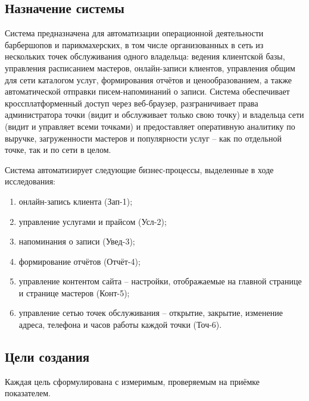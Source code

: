 \subsection{Назначение системы}

Система предназначена для автоматизации операционной деятельности барбершопов и парикмахерских, в том числе организованных в сеть из нескольких точек обслуживания одного владельца: ведения клиентской базы, управления расписанием мастеров, онлайн-записи клиентов, управления общим для сети каталогом услуг, формирования отчётов и ценообразованием, а также автоматической отправки писем-напоминаний о записи. Система обеспечивает кроссплатформенный доступ через веб-браузер, разграничивает права администратора точки (видит и обслуживает только свою точку) и владельца сети (видит и управляет всеми точками) и предоставляет оперативную аналитику по выручке, загруженности мастеров и популярности услуг -- как по отдельной точке, так и по сети в целом.

Система автоматизирует следующие бизнес-процессы, выделенные в ходе исследования:
\begin{enumerate}
  \item онлайн-запись клиента (Зап-1);
  \item управление услугами и прайсом (Усл-2);
  \item напоминания о записи (Увед-3);
  \item формирование отчётов (Отчёт-4);
  \item управление контентом сайта -- настройки, отображаемые на главной странице и странице мастеров (Конт-5);
  \item управление сетью точек обслуживания -- открытие, закрытие, изменение адреса, телефона и часов работы каждой точки (Точ-6).
\end{enumerate}

\subsection{Цели создания}

Каждая цель сформулирована с измеримым, проверяемым на приёмке показателем.

